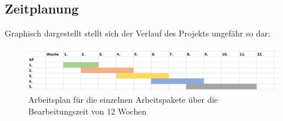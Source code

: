 \subsection{Zeitplanung}

Graphisch dargestellt stellt sich der Verlauf des Projekts ungefähr so dar:

\begin{figure}[h]
	\begin{center}
		\includegraphics[scale=0.5]{Zeitplan_graphisch.jpg}
		\caption[Arbeitsplan]{Arbeitsplan für die einzelnen Arbeitspakete über die Bearbeitungszeit von 12 Wochen}
	\end{center}
\end{figure}


















